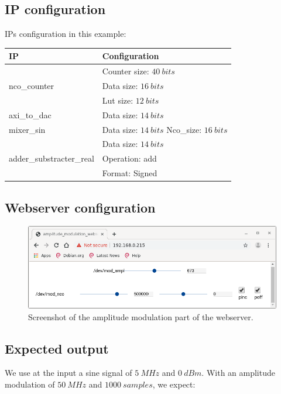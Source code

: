 \documentclass[12pt,oneside]{article}
\begin{document}
\subsection{IP configuration}
\vspace{0.5cm}
IPs configuration in this example:
\begin{center}
	\begin{tabular}{|>{\centering\arraybackslash}m{.3\linewidth} | >{\centering\arraybackslash}m{.3\linewidth} |}
		\hline
		IP & Configuration \\
		\hline
		& Counter size: $40~bits$\\ nco\_counter &Data size: $16~bits$\\ &Lut size: $12~bits$ \\
		\hline
		axi\_to\_dac&Data size: $14~bits$ \\
		\hline
		mixer\_sin&Data size: $14~bits$ \newline Nco\_size: $16~bits$ \\
		\hline
		& Data size: $14~bits$\\adder\_substracter\_real & Operation: add\\ &Format: Signed \\
		\hline
	\end{tabular}
\end{center}
\vspace{0.1cm}
\subsection{Webserver configuration}


\begin{figure}[!h!tb]
	\begin{center}
		\includegraphics[width=14cm]{figures/ampl_mod_webserver.png}
		\caption{Screenshot of the amplitude modulation part of the webserver.}
		\label{fig:amplModWs}
	\end{center}
\end{figure}
\vspace{-1cm}

\subsection{Expected output}
We use at the input a sine signal of $5~MHz$ and $0~dBm$.
With an amplitude modulation of $50~MHz$ and $1000~samples$, we expect: \newpage
\end{document}
